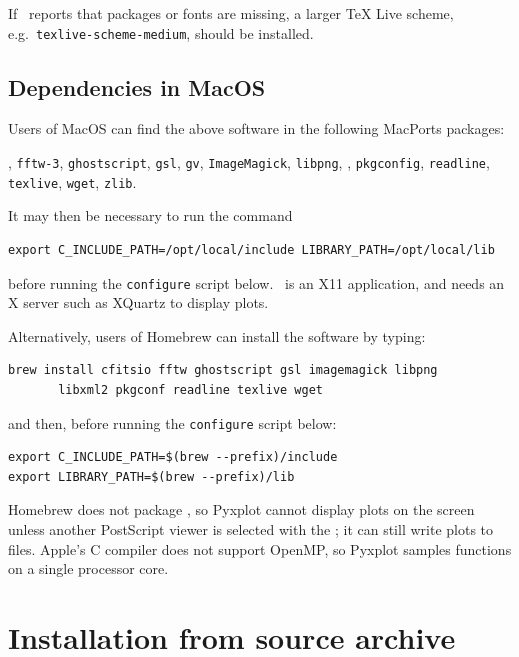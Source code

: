 \noindent If \latexdcf\ reports that packages or fonts are missing, a larger
TeX Live scheme, e.g.\ {\tt texlive-scheme-medium}, should be installed.

\subsection{Dependencies in MacOS}

Users of MacOS can find the above software in the following MacPorts packages:

\vspace{2mm}
, {\tt fftw-3}, {\tt ghostscript}, {\tt gsl}, {\tt gv}, {\tt ImageMagick}, {\tt libpng},\newline
{}, {\tt pkgconfig}, {\tt readline}, {\tt texlive}, {\tt wget}, {\tt zlib}.
\vspace{2mm}

It may then be necessary to run the command
\begin{verbatim}
export C_INCLUDE_PATH=/opt/local/include LIBRARY_PATH=/opt/local/lib
\end{verbatim}
before running the {\tt configure} script below. \ghostview\ is an X11
application, and needs an X server such as XQuartz to display plots.

Alternatively, users of Homebrew can install the software by
typing:

\begin{verbatim}
brew install cfitsio fftw ghostscript gsl imagemagick libpng
       libxml2 pkgconf readline texlive wget
\end{verbatim}

\noindent and then, before running the {\tt configure} script below:

\begin{verbatim}
export C_INCLUDE_PATH=$(brew --prefix)/include
export LIBRARY_PATH=$(brew --prefix)/lib
\end{verbatim}

\noindent Homebrew does not package \ghostview, so Pyxplot cannot display plots
on the screen unless another PostScript viewer is selected with the
; it can still write plots to files. Apple's C compiler does
not support OpenMP, so Pyxplot samples functions on a single processor core.

\section{Installation from source archive}

